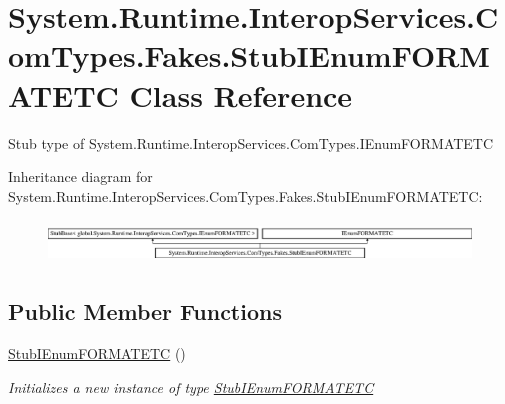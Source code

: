 \hypertarget{class_system_1_1_runtime_1_1_interop_services_1_1_com_types_1_1_fakes_1_1_stub_i_enum_f_o_r_m_a_t_e_t_c}{\section{System.\-Runtime.\-Interop\-Services.\-Com\-Types.\-Fakes.\-Stub\-I\-Enum\-F\-O\-R\-M\-A\-T\-E\-T\-C Class Reference}
\label{class_system_1_1_runtime_1_1_interop_services_1_1_com_types_1_1_fakes_1_1_stub_i_enum_f_o_r_m_a_t_e_t_c}
}


Stub type of System.\-Runtime.\-Interop\-Services.\-Com\-Types.\-I\-Enum\-F\-O\-R\-M\-A\-T\-E\-T\-C 


Inheritance diagram for System.\-Runtime.\-Interop\-Services.\-Com\-Types.\-Fakes.\-Stub\-I\-Enum\-F\-O\-R\-M\-A\-T\-E\-T\-C\-:\begin{figure}[H]
\begin{center}
\leavevmode
\includegraphics[height=1.133603cm]{class_system_1_1_runtime_1_1_interop_services_1_1_com_types_1_1_fakes_1_1_stub_i_enum_f_o_r_m_a_t_e_t_c}
\end{center}
\end{figure}
\subsection*{Public Member Functions}
\begin{DoxyCompactItemize}
\item 
\hyperlink{class_system_1_1_runtime_1_1_interop_services_1_1_com_types_1_1_fakes_1_1_stub_i_enum_f_o_r_m_a_t_e_t_c_a55f82452017020c69d56031eeaf80d22}{Stub\-I\-Enum\-F\-O\-R\-M\-A\-T\-E\-T\-C} ()
\begin{DoxyCompactList}\small\item\em Initializes a new instance of type \hyperlink{class_system_1_1_runtime_1_1_interop_services_1_1_com_types_1_1_fakes_1_1_stub_i_enum_f_o_r_m_a_t_e_t_c}{Stub\-I\-Enum\-F\-O\-R\-M\-A\-T\-E\-T\-C}\end{DoxyCompactList}\end{DoxyCompactItemize}
